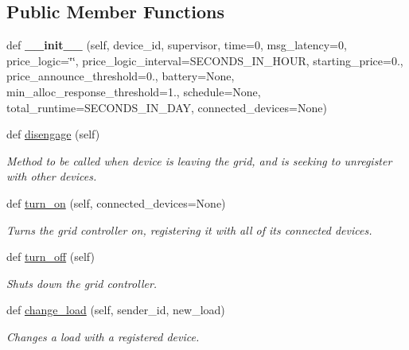 \subsection*{Public Member Functions}
\begin{DoxyCompactItemize}
\item 
\mbox{\label{class_build_1_1_objects_1_1grid__controller_1_1_grid_controller_a3ce9369664b081a2fbfb03252d00e3f0}} 
def {\bfseries \+\_\+\+\_\+init\+\_\+\+\_\+} (self, device\+\_\+id, supervisor, time=0, msg\+\_\+latency=0, price\+\_\+logic=\char`\"{}\char`\"{}, price\+\_\+logic\+\_\+interval=S\+E\+C\+O\+N\+D\+S\+\_\+\+I\+N\+\_\+\+H\+O\+UR, starting\+\_\+price=0., price\+\_\+announce\+\_\+threshold=0., battery=None, min\+\_\+alloc\+\_\+response\+\_\+threshold=1., schedule=None, total\+\_\+runtime=S\+E\+C\+O\+N\+D\+S\+\_\+\+I\+N\+\_\+\+D\+AY, connected\+\_\+devices=None)
\item 
def \hyperlink{class_build_1_1_objects_1_1grid__controller_1_1_grid_controller_a9c3ee1f54a453b5008d1118d9da1b8ed}{disengage} (self)
\begin{DoxyCompactList}\small\item\em Method to be called when device is leaving the grid, and is seeking to unregister with other devices. \end{DoxyCompactList}\item 
def \hyperlink{class_build_1_1_objects_1_1grid__controller_1_1_grid_controller_a024c6220ba4e03dca547d99e1f3a39be}{turn\+\_\+on} (self, connected\+\_\+devices=None)
\begin{DoxyCompactList}\small\item\em Turns the grid controller on, registering it with all of its connected devices. \end{DoxyCompactList}\item 
def \hyperlink{class_build_1_1_objects_1_1grid__controller_1_1_grid_controller_afdea3e05f02d0c838ee8647a8f60ddf7}{turn\+\_\+off} (self)
\begin{DoxyCompactList}\small\item\em Shuts down the grid controller. \end{DoxyCompactList}\item 
def \hyperlink{class_build_1_1_objects_1_1grid__controller_1_1_grid_controller_a672af7e3a1bfe6ec323cd2d5a9e2b85a}{change\+\_\+load} (self, sender\+\_\+id, new\+\_\+load)
\begin{DoxyCompactList}\small\item\em Changes a load with a registered device. \end{DoxyCompactList}\item 

\end{DoxyCompactItemize}
